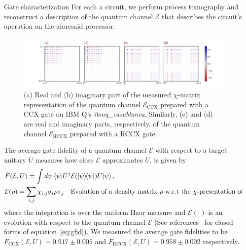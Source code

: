 \documentclass[final]{beamer}
\newlength{\sepwidth}
\newlength{\colwidth}
\newcommand{\separatorcolumn}{\begin{column}{\sepwidth}\end{column}}
\begin{document}
\begin{frame}[t]
\begin{columns}[t]
\begin{column}{\colwidth}
\begin{block}{Gate characterization}
                    For each a circuit, we perform process tomography and reconstruct a description of the quantum channel $\mathcal{E}$ that describes the circuit's operation on the aforesaid processor.
                    \begin{figure}[htpb]
                        \includegraphics[width=\linewidth]{chi_mats.png}
                        \caption{(a) Real  and (b) imaginary part of the measured $\chi$-matrix representation of the quantum channel $\mathcal{E}_\text{CCX}$ prepared with a CCX gate on IBM Q's \emph{ibmq\_casablanca}. Similarly, (c) and (d) are real and imaginary parts, respectively, of the quantum channel $\mathcal{E}_\text{RCCX}$ prepared with a RCCX gate.}
                        \label{fig:mat3d}
                    \end{figure}
                 The average gate fidelity of a quantum channel $\mathcal{E}$ with respect to a target unitary $U$ measures how close $\mathcal{E}$ approximates $U$, is given by 
                 \begin{align}\label{eq:gfid}
                     & \bar{F}(\mathcal{E}, U) = \int d\psi \expval{U^{\dagger} \mathcal{E}(\dyad{\psi}) U}{\psi}, \\
                     & \mathcal{E}(\rho) = \displaystyle\sum_{i,j} \chi_{i,j} \sigma_i \rho \sigma_j \quad \text{Evolution of a density matrix $\rho$ w.r.t the $\chi$-presentation of $\mathcal{E}$.}
                 \end{align}
                 where the integration is over the uniform Haar measure and $\mathcal{E}(\cdot)$ is an evolution with respect to the quantum channel $\mathcal{E}$ (See references~\cite{Nielsen_2002,Magesan_2011} for closed forms of equation~\ref{eq:gfid}). We measured the average gate fidelities to be $\bar{F}_\text{CCX}(\mathcal{E}, U) = 0.917 \pm 0.005$ and $\bar{F}_\text{RCCX}(\mathcal{E}, U) = 0.958 \pm 0.002$ respectively.
                 \end{block}
            \end{column}

            \separatorcolumn


\end{columns}
\end{frame}
\end{document}
